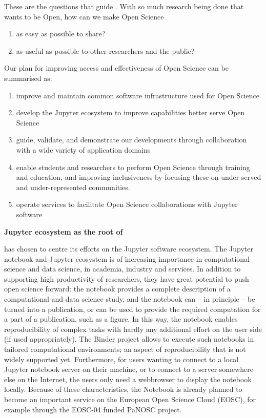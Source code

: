 These are the questions that guide \TheProject.
With so much research being done that wants to be Open,
how can we make Open Science

\begin{enumerate}
    \item as easy as possible to share?
    \item as useful as possible to other researchers and the public?
\end{enumerate}

\noindent Our plan for improving access and effectiveness of Open Science can be summarised as:

\begin{enumerate}
\item improve and maintain common software infrastructure used for
  Open Science
\item develop the Jupyter ecosystem to improve capabilities better
  serve Open Science
\item guide, validate, and demonstrate our developments through
  collaboration with a wide variety of application domains
\item enable students and researchers to perform Open Science through
  training and education, and improving inclusiveness by focusing
  these on under-served and under-represented communities.
\item operate services to facilitate Open Science collaborations with
  Jupyter software
\end{enumerate}

\medskip
\textbf{Jupyter ecosystem as the root of \TheProject}

\TheProject has chosen to centre its efforts on the Jupyter software
ecosystem.  The Jupyter notebook and Jupyter ecosystem is of
increasing importance in computational science and data science, in
academia, industry and services. In addition to supporting high
productivity of researchers, they have great potential to push open
science forward: the notebook provides a complete description of a
computational and data science study, and the notebook can -- in
principle -- be turned into a publication, or can be used to provide
the required computation for a part of a publication, such as a
figure. In this way, the notebook enables reproducibility of complex
tasks with hardly any additional effort on the user side (if used
appropriately). The Binder project allows to execute such notebooks in
tailored computational environments; an aspect of reproducibility that
is not widely supported yet. Furthermore, for users wanting to connect
to a local Jupyter notebook server on their machine, or to connect to
a server somewhere else on the Internet, the users only need a
webbrowser to display the notebook locally. Because of these
characteristics, the Notebook is already planned to become an
important service on the European Open Science Cloud (EOSC), for
example through the EOSC-04 funded PaNOSC project.

